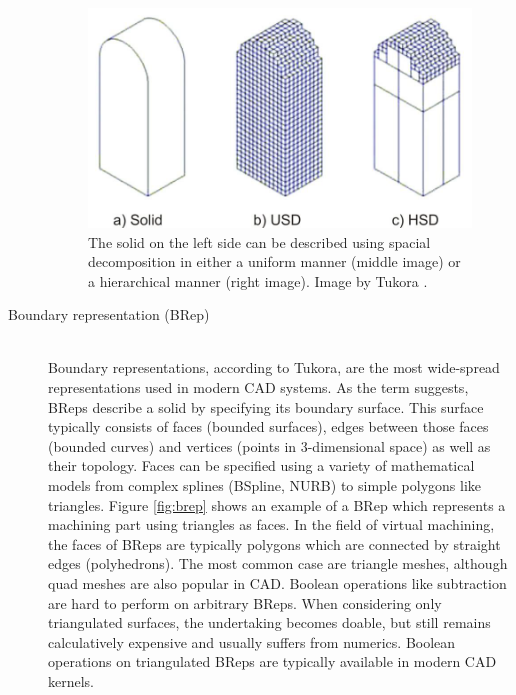 \begin{description}
	\begin{figure}[h]
		\centering
		\includegraphics[width=\textwidth]{images/spacial_decomposition}
		\caption{
			The solid on the left side can be described using spacial decomposition in either a uniform manner (middle image) or a hierarchical manner (right image).
			Image by Tukora \cite{virtual_machining_review}. 
		}
		\label{fig:spacial_decomposition}
	\end{figure}
	

	\item[Boundary representation (BRep)] \hfill \\
	Boundary representations, according to Tukora, are the most wide-spread representations used in modern CAD systems.
	As the term suggests, BReps describe a solid by specifying its boundary surface.
	This surface typically consists of faces (bounded surfaces), edges between those faces (bounded curves) and vertices (\ie points in 3-dimensional space) as well as their topology.
	Faces can be specified using a variety of mathematical models from complex splines (BSpline, NURB) to simple polygons like triangles.
	Figure \ref{fig:brep} shows an example of a BRep which represents a machining part using triangles as faces.
	In the field of virtual machining, the faces of BReps are typically polygons which are connected by straight edges (\ie polyhedrons).
	The most common case are triangle meshes, although quad meshes are also popular in CAD.
	Boolean operations like subtraction are hard to perform on arbitrary BReps.
	When considering only triangulated surfaces, the undertaking becomes doable, but still remains calculatively expensive and usually suffers from numerics.
	Boolean operations on triangulated BReps are typically available in modern CAD kernels.
	

\end{description}
